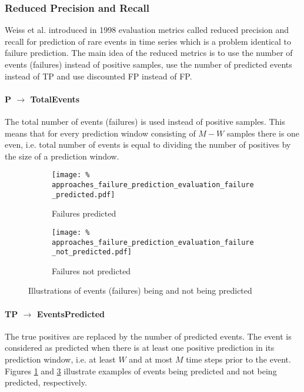 \subsubsection{Reduced Precision and Recall}

Weiss et al. introduced in 1998 evaluation metrics called reduced precision and recall for prediction of rare events in time series \cite{weiss1998learning} which is a problem identical to failure prediction.
The main idea of the reduced metrics is to use the number of events (failures) instead of positive samples, use the number of predicted events instead of TP and use discounted FP instead of FP.

\paragraph{P $\rightarrow$ TotalEvents}
The total number of events (failures) is used instead of positive samples.
This means that for every prediction window consisting of $M - W$ samples there is one even, i.e. total number of events is equal to dividing the number of positives by the size of a prediction window.

\begin{figure}
    \centering
    \begin{subfigure}{.45\textwidth}
        \centering
        \texttt{[image: \%
            approaches\_failure\_prediction\_evaluation\_failure\_predicted.pdf]}
        \caption{Failures predicted}
      \label{fig:approaches_failure_prediction_evaluation_failure_predicted}
    \end{subfigure}%
    \begin{subfigure}{.45\textwidth}
        \centering
        \texttt{[image: \%
            approaches\_failure\_prediction\_evaluation\_failure\_not\_predicted.pdf]}
        \caption{Failures not predicted}
        \label{fig:approaches_failure_prediction_evaluation_failure_not_predicted}
    \end{subfigure}
    \caption{Illustrations of events (failures) being and not being predicted}
\end{figure}

\paragraph{TP $\rightarrow$ EventsPredicted}
The true positives are replaced by the number of predicted events.
The event is considered as predicted when there is at least one positive prediction in its prediction window, i.e. at least $W$ and at most $M$ time steps prior to the event.
Figures \ref{fig:approaches_failure_prediction_evaluation_failure_predicted} and \ref{fig:approaches_failure_prediction_evaluation_failure_not_predicted} illustrate examples of events being predicted and not being predicted, respectively.

